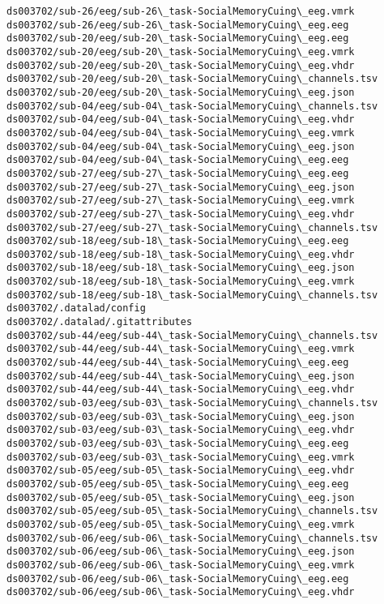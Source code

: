\documentclass[11pt]{article}
\begin{document}
\begin{Verbatim}[commandchars=\\\{\}]
ds003702/sub-26/eeg/sub-26\_task-SocialMemoryCuing\_eeg.vmrk
ds003702/sub-26/eeg/sub-26\_task-SocialMemoryCuing\_eeg.eeg
ds003702/sub-20/eeg/sub-20\_task-SocialMemoryCuing\_eeg.eeg
ds003702/sub-20/eeg/sub-20\_task-SocialMemoryCuing\_eeg.vmrk
ds003702/sub-20/eeg/sub-20\_task-SocialMemoryCuing\_eeg.vhdr
ds003702/sub-20/eeg/sub-20\_task-SocialMemoryCuing\_channels.tsv
ds003702/sub-20/eeg/sub-20\_task-SocialMemoryCuing\_eeg.json
ds003702/sub-04/eeg/sub-04\_task-SocialMemoryCuing\_channels.tsv
ds003702/sub-04/eeg/sub-04\_task-SocialMemoryCuing\_eeg.vhdr
ds003702/sub-04/eeg/sub-04\_task-SocialMemoryCuing\_eeg.vmrk
ds003702/sub-04/eeg/sub-04\_task-SocialMemoryCuing\_eeg.json
ds003702/sub-04/eeg/sub-04\_task-SocialMemoryCuing\_eeg.eeg
ds003702/sub-27/eeg/sub-27\_task-SocialMemoryCuing\_eeg.eeg
ds003702/sub-27/eeg/sub-27\_task-SocialMemoryCuing\_eeg.json
ds003702/sub-27/eeg/sub-27\_task-SocialMemoryCuing\_eeg.vmrk
ds003702/sub-27/eeg/sub-27\_task-SocialMemoryCuing\_eeg.vhdr
ds003702/sub-27/eeg/sub-27\_task-SocialMemoryCuing\_channels.tsv
ds003702/sub-18/eeg/sub-18\_task-SocialMemoryCuing\_eeg.eeg
ds003702/sub-18/eeg/sub-18\_task-SocialMemoryCuing\_eeg.vhdr
ds003702/sub-18/eeg/sub-18\_task-SocialMemoryCuing\_eeg.json
ds003702/sub-18/eeg/sub-18\_task-SocialMemoryCuing\_eeg.vmrk
ds003702/sub-18/eeg/sub-18\_task-SocialMemoryCuing\_channels.tsv
ds003702/.datalad/config
ds003702/.datalad/.gitattributes
ds003702/sub-44/eeg/sub-44\_task-SocialMemoryCuing\_channels.tsv
ds003702/sub-44/eeg/sub-44\_task-SocialMemoryCuing\_eeg.vmrk
ds003702/sub-44/eeg/sub-44\_task-SocialMemoryCuing\_eeg.eeg
ds003702/sub-44/eeg/sub-44\_task-SocialMemoryCuing\_eeg.json
ds003702/sub-44/eeg/sub-44\_task-SocialMemoryCuing\_eeg.vhdr
ds003702/sub-03/eeg/sub-03\_task-SocialMemoryCuing\_channels.tsv
ds003702/sub-03/eeg/sub-03\_task-SocialMemoryCuing\_eeg.json
ds003702/sub-03/eeg/sub-03\_task-SocialMemoryCuing\_eeg.vhdr
ds003702/sub-03/eeg/sub-03\_task-SocialMemoryCuing\_eeg.eeg
ds003702/sub-03/eeg/sub-03\_task-SocialMemoryCuing\_eeg.vmrk
ds003702/sub-05/eeg/sub-05\_task-SocialMemoryCuing\_eeg.vhdr
ds003702/sub-05/eeg/sub-05\_task-SocialMemoryCuing\_eeg.eeg
ds003702/sub-05/eeg/sub-05\_task-SocialMemoryCuing\_eeg.json
ds003702/sub-05/eeg/sub-05\_task-SocialMemoryCuing\_channels.tsv
ds003702/sub-05/eeg/sub-05\_task-SocialMemoryCuing\_eeg.vmrk
ds003702/sub-06/eeg/sub-06\_task-SocialMemoryCuing\_channels.tsv
ds003702/sub-06/eeg/sub-06\_task-SocialMemoryCuing\_eeg.json
ds003702/sub-06/eeg/sub-06\_task-SocialMemoryCuing\_eeg.vmrk
ds003702/sub-06/eeg/sub-06\_task-SocialMemoryCuing\_eeg.eeg
ds003702/sub-06/eeg/sub-06\_task-SocialMemoryCuing\_eeg.vhdr

\end{Verbatim}
\end{document}
